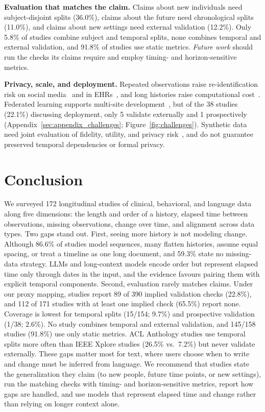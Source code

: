 \documentclass[11pt]{article}
\theoremstyle{plain}
\theoremstyle{definition}
\theoremstyle{remark}
\begin{document}
\noindent\textbf{Evaluation that matches the claim.} Claims about new individuals need subject-disjoint splits (36.0\%), claims about the future need chronological splits (11.0\%), and claims about new settings need external validation (12.2\%). Only 5.8\% of studies combine subject and temporal splits, none combines temporal and external validation, and 91.8\% of  studies use static metrics. \emph{Future work} should run the checks its claims require and employ timing- and horizon-sensitive metrics.

\noindent\textbf{Privacy, scale, and deployment.} Repeated observations raise re-identification risk on social media~\citep{8914586} and in EHRs~\citep{9623284}, and long histories raise computational cost~\citep{tsakalidis-etal-2022-identifying,hills-etal-2023-creation}. Federated learning supports multi-site development~\citep{9983621}, but of the 38 studies (22.1\%) discussing deployment, only 5 validate externally and 1 prospectively (Appendix~\ref{sec:appendix_challenges}; Figure~\ref{fig:challenges}). Synthetic data need joint evaluation of fidelity, utility, and privacy risk~\citep{11563433}, and do not guarantee preserved temporal dependencies or formal privacy.

\section{Conclusion}
\label{sec:conclusion}
We surveyed 172 longitudinal studies of clinical, behavioral, and language data along five dimensions: the length and order of a history, elapsed time between observations, missing observations, change over time, and alignment across data types. Two gaps stand out. First, seeing more history is not modeling change. Although 86.6\% of studies model sequences, many flatten histories, assume equal spacing, or treat a timeline as one long document, and 59.3\% state no missing-data strategy. LLMs and long-context models encode order but represent elapsed time only through dates in the input, and the evidence favours pairing them with explicit temporal components. Second, evaluation rarely matches claims. Under our proxy mapping, studies report 89 of 390 implied
validation checks (22.8\%), and 112 of 171 studies with
at least one implied check (65.5\%) report none.
Coverage is lowest for temporal splits (15/154; 9.7\%)
and prospective validation (1/38; 2.6\%).
No study combines temporal and external validation,
and 145/158  studies (91.8\%)
use only static metrics. ACL Anthology studies use temporal splits more often than IEEE Xplore studies (26.5\% vs.\ 7.2\%) but never validate externally. These gaps matter most for text, where users choose when to write and change must be inferred from language. We recommend that studies state the generalization they claim (to new people, future time points, or new settings), run the matching checks with timing- and horizon-sensitive metrics, report how gaps are handled, and use models that represent elapsed time and change rather than relying on longer context alone.
\end{document}
